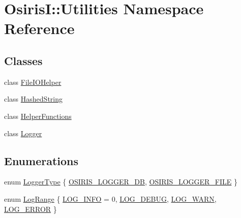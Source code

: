 \hypertarget{namespace_osiris_i_1_1_utilities}{\section{Osiris\-I\-:\-:Utilities Namespace Reference}
\label{namespace_osiris_i_1_1_utilities}
}
\subsection*{Classes}
\begin{DoxyCompactItemize}
\item 
class \hyperlink{class_osiris_i_1_1_utilities_1_1_file_i_o_helper}{File\-I\-O\-Helper}
\item 
class \hyperlink{class_osiris_i_1_1_utilities_1_1_hashed_string}{Hashed\-String}
\item 
class \hyperlink{class_osiris_i_1_1_utilities_1_1_helper_functions}{Helper\-Functions}
\item 
class \hyperlink{class_osiris_i_1_1_utilities_1_1_logger}{Logger}
\end{DoxyCompactItemize}
\subsection*{Enumerations}
\begin{DoxyCompactItemize}
\item 
enum \hyperlink{namespace_osiris_i_1_1_utilities_a77a3086b9443f21343ccbe78d283cbfe}{Logger\-Type} \{ \hyperlink{namespace_osiris_i_1_1_utilities_a77a3086b9443f21343ccbe78d283cbfea22bf2688e8375b6d5b8677c460d6ebdc}{O\-S\-I\-R\-I\-S\-\_\-\-L\-O\-G\-G\-E\-R\-\_\-\-D\-B}, 
\hyperlink{namespace_osiris_i_1_1_utilities_a77a3086b9443f21343ccbe78d283cbfea6cbfc139b21e633b1095dd6a8f0289b4}{O\-S\-I\-R\-I\-S\-\_\-\-L\-O\-G\-G\-E\-R\-\_\-\-F\-I\-L\-E}
 \}
\item 
enum \hyperlink{namespace_osiris_i_1_1_utilities_a8a7398a763a2e2e8cc657d8b44b95c20}{Log\-Range} \{ \hyperlink{namespace_osiris_i_1_1_utilities_a8a7398a763a2e2e8cc657d8b44b95c20ab58f792a1d335b01bb1cf2d16dd4cafa}{L\-O\-G\-\_\-\-I\-N\-F\-O} = 0, 
\hyperlink{namespace_osiris_i_1_1_utilities_a8a7398a763a2e2e8cc657d8b44b95c20a16cf86ae6137d3c2e146e5b059525d63}{L\-O\-G\-\_\-\-D\-E\-B\-U\-G}, 
\hyperlink{namespace_osiris_i_1_1_utilities_a8a7398a763a2e2e8cc657d8b44b95c20aefc23febc6fdfcac97143a6f22a2b1c9}{L\-O\-G\-\_\-\-W\-A\-R\-N}, 
\hyperlink{namespace_osiris_i_1_1_utilities_a8a7398a763a2e2e8cc657d8b44b95c20abd9b3c508fff4e9fbca7ce7b704b650a}{L\-O\-G\-\_\-\-E\-R\-R\-O\-R}
 \}
\end{DoxyCompactItemize}
